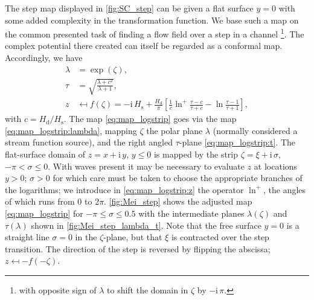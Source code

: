 \documentclass[internal]{sintefmemo}
\newcommand{\mr}{\mathrm}
\let\SSS\S
\renewcommand{\S}{^\mr{S}}
\newcommand{\ii}{\mr{i}\,}
\renewcommand{\_}[1]{_\mr{#1}}
\newcommand{\z}{z}
\newcommand{\x}{x}
\newcommand{\y}{y}
\newcommand{\zz}{\zeta}
\newcommand{\xx}{\xi}
\newcommand{\yy}{\sigma}
\newcommand{\zmap}{f}
\begin{document}
The step map displayed in \autoref{fig:SC_step} can be given a flat surface $y=0$ with some added complexity in the transformation function.
We base such a map on the common presented task of finding a flow field over a step in a channel \citep[e.g.,][\SSS 4.3.2]{mei_2005}\footnote{with opposite sign of $\lambda$ to shift the domain in $\zz$ by $-\ii\pi$.}.
The complex potential there created can itself be regarded as a conformal map.
Accordingly, we have
\begin{subequations}
\begin{align}
\lambda &= \exp(\zz),\label{eq:map_logstrip:lambda}\\
\tau &= \sqrt{\frac{\lambda+c^2}{\lambda+1} },\label{eq:map_logstrip:t}\\
z &\mapsfrom \zmap(\zz) = -\ii H\_s +\frac{H\_d}{\pi}\left[ 
\frac1c \ln^+\frac{\tau-c}{\tau+c} - \ln\frac{\tau-1}{\tau+1}
\right]\label{eq:map_logstrip:z},
\end{align}%
\label{eq:map_logstrip}%
\end{subequations}%
with $c = H\_d/H\_s$.
The map \eqref{eq:map_logstrip} goes via the map \eqref{eq:map_logstrip:lambda}, mapping $\zz$ the polar plane $\lambda$ (normally considered a stream function source), and the right angled $\tau$-plane \eqref{eq:map_logstrip:t}.
The flat-surface domain of $z=\x+\ii\y$, $\y\leq0$ is mapped by the strip $\zz=\xx+\ii\yy$, $-\pi<\yy\leq0$.
With waves present it may be necessary to evaluate $\z$ at locations $\y>0$; $\yy>0$ for which care must be taken to choose the appropriate branches of the logarithms;
we introduce in \eqref{eq:map_logstrip:z} the operator $\ln^+$, the angles of which runs from $0$ to $2\pi$. 
\autoref{fig:Mei_step} shows the adjusted map \eqref{eq:map_logstrip} for $-\pi\leq\yy\leq0.5$ with the intermediate planes $\lambda(\zz)$ and $\tau(\lambda)$ shown in \autoref{fig:Mei_step_lambda_t}.
Note that the free surface $\y=0$ is a straight line  $\yy=0$ in the $\zz$-plane, but that $\xx$ is contracted over the step transition.
The direction of the step is reversed by flipping the abscissa; $z\mapsfrom-f(-\zz)$.  
\end{document}
